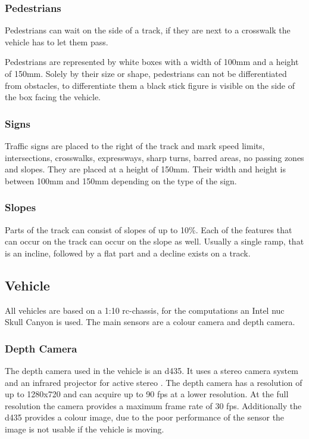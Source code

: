 \subsubsection{Pedestrians}
Pedestrians can wait on the side of a track, if they are next to a crosswalk the vehicle has to let them pass.

Pedestrians are represented by white boxes with a width of 100mm and a height of 150mm. Solely by their size or shape, pedestrians can not be differentiated from obstacles, to differentiate them a black stick figure is visible on the side of the box facing the vehicle.

\subsubsection{Signs}
Traffic signs are placed to the right of the track and mark speed limits, intersections, crosswalks, expressways, sharp turns, barred areas, no passing zones and slopes.
They are placed at a height of 150mm. Their width and height is between 100mm and 150mm depending on the type of the sign.

\subsubsection{Slopes} \label{sec:det:ramp}
Parts of the track can consist of slopes of up to 10\%. Each of the features that can occur on the track can occur on the slope as well. Usually a single ramp, that is an incline, followed by a flat part and a decline exists on a track.

\subsection{Vehicle}
All vehicles are based on a 1:10 \ac{rc}-chassis, for the computations an Intel \ac{nuc} Skull Canyon is used. The main sensors are a colour camera and depth camera.

\subsubsection{Depth Camera}
The depth camera used in the vehicle is an \ac{d435}. It uses a stereo camera system and an infrared projector for active stereo \cite{D435}. 
The depth camera has a resolution of up to 1280x720 and can acquire up to 90 \ac{fps} at a lower resolution. 
At the full resolution the camera provides a maximum frame rate of 30 \ac{fps}.
Additionally the \ac{d435} provides a colour image, due to the poor performance of the sensor the image is not usable if the vehicle is moving.

